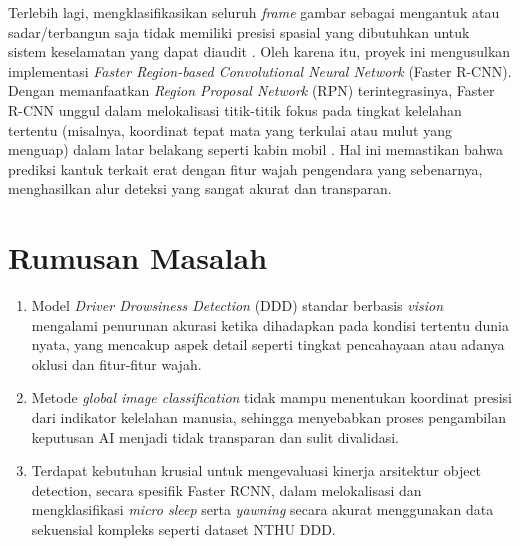 \documentclass[11pt,a4paper,oneside]{report}
\begin{document}
Terlebih lagi, mengklasifikasikan seluruh \textit{frame} gambar sebagai mengantuk atau sadar/terbangun saja tidak memiliki presisi spasial yang dibutuhkan untuk sistem keselamatan yang dapat diaudit \cite{b6}. Oleh karena itu, proyek ini mengusulkan implementasi \textit{Faster Region-based Convolutional Neural Network} (Faster R-CNN). Dengan memanfaatkan \textit{Region Proposal Network} (RPN) terintegrasinya, Faster R-CNN unggul dalam melokalisasi titik-titik fokus pada tingkat kelelahan tertentu (misalnya, koordinat tepat mata yang terkulai atau mulut yang menguap) dalam latar belakang seperti kabin mobil \cite{b7} \cite{b8}. Hal ini memastikan bahwa prediksi kantuk terkait erat dengan fitur wajah pengendara yang sebenarnya, menghasilkan alur deteksi yang sangat akurat dan transparan.

\section{Rumusan Masalah}

\begin{enumerate}
    \item Model \textit{Driver Drowsiness Detection} (DDD) standar berbasis \textit{vision} mengalami penurunan akurasi ketika dihadapkan pada kondisi tertentu dunia nyata, yang mencakup aspek detail seperti tingkat pencahayaan atau adanya oklusi dan fitur-fitur wajah.
    \item Metode \textit{global image classification} tidak mampu menentukan koordinat presisi dari indikator kelelahan manusia, sehingga menyebabkan proses pengambilan keputusan AI menjadi tidak transparan dan sulit divalidasi.
    \item Terdapat kebutuhan krusial untuk mengevaluasi kinerja arsitektur object detection, secara spesifik Faster RCNN, dalam melokalisasi dan mengklasifikasi \textit{micro sleep} serta \textit{yawning} secara akurat menggunakan data sekuensial kompleks seperti dataset NTHU DDD.
\end{enumerate}
\end{document}
